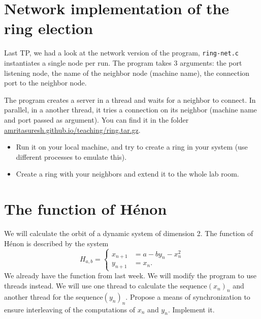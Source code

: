 \documentclass[11pt]{article}
\begin{document}
%
%
%


\section{ Network implementation of the ring election}
Last TP, we had a look at the network version of the program, \texttt{ring-net.c} instantiates a single node per run. The program takes 3 arguments: the port listening node, the name of the neighbor node (machine name), the connection port to the neighbor node. 

The program creates a server in a thread and waits for a neighbor to connect. In parallel, in a
another thread, it tries a connection on its neighbor (machine name and port passed as argument). You can find it in the folder \url{amritasuresh.github.io/teaching/ring.tar.gz}.
\begin{itemize}
	\item Run it on your local machine, and try to create a ring in your system (use different processes to emulate this).
	\item Create a ring with your neighbors and extend it to the whole lab room. 
\end{itemize}

\section{The function of Hénon}

We will calculate the orbit of a dynamic system of dimension 2. The function of Hénon is described by the system 
\begin{equation*}
	\label{eq:1}
	H_{a,b} = \left\{
	\begin{aligned}
		x_{n+1} &= a - by_{n} - x_{n}^{2} \\
		y_{n+1} &= x_{n}.
	\end{aligned}
	\right.
\end{equation*}
We already have the function from last week. We will modify the program to use threads instead. We will use one thread to calculate the sequence\( (x_{n})_{n} \) and another thread for the sequence\( (y_{n})_{n} \). Propose a means of synchronization to ensure interleaving of the computations of $x_n$ and $y_n$. Implement it. 
\end{document}

